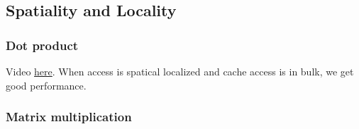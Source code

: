 \documentclass{../../ainote}
\begin{document}

\subsection{Spatiality and Locality}
\subsubsection{Dot product}
Video \href{https://www.youtube.com/watch?v=rIwEPyWAsDo}{here}.
When access is spatical localized and cache access is in bulk, we get good performance.
\subsubsection{Matrix multiplication}
\end{document}
